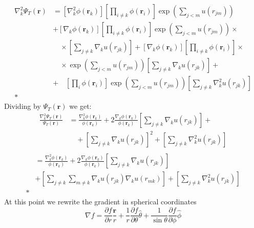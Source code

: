 \begin{align}
    \nabla_k^2 \Psi_T(\mathbf{r}) &= \left[ \nabla_k^2 \phi(\mathbf{r}_k) \right] \left[ \prod_{i \neq k} \phi(\mathbf{r}_i) \right] \exp{\left(\sum_{j<m}u(r_{jm})\right)} \nonumber\\ 
    &+ \left[ \nabla_k \phi(\mathbf{r}_k) \right]  \left[ \prod_{i \neq k} \phi(\mathbf{r}_i) \right] \exp{\left(\sum_{j<m}u(r_{jm})\right)}\times \nonumber\\
    & \quad \times \left[ \sum_{j\neq k} \nabla_k u(r_{jk}) \right] + \left[ \nabla_k \phi(\mathbf{r}_k) \right] \left[ \prod_{i \neq k} \phi(\mathbf{r}_i) \right] \times \nonumber\\ 
    & \quad \times \exp{\left(\sum_{j<m} u(r_{jm}) \right)} \left[ \sum_{j\neq k} \nabla_k u(r_{jk}) \right] + \nonumber\\ 
    &+\quad\left[\prod_i \phi(\mathbf{r}_i) \right] \exp{\left(\sum_{j<m} u(r_{jm}) \right)} \left[ \sum_{j\neq k} \nabla_k^2 u(r_{jk}) \right]\nonumber\\*
\end{align}
Dividing by $\Psi_T(\mathbf{r})$ we get: 
\begin{align*}
    \frac{ \nabla_k^2 \Psi_T(\mathbf{r})}{\Psi_T(\mathbf{r})} &= \frac{\nabla_k^2 \phi(\mathbf{r}_k)}{\phi(\mathbf{r}_k)} + 2 \frac{\nabla_k \phi(\mathbf{r}_k)}{\phi(\mathbf{r}_k)} \left[ \sum_{j\neq k} \nabla_k u(r_{jk}) \right] + \\
    & \quad +\left[ \sum_{j\neq k} \nabla_k u(r_{jk}) \right]^2 + \left[ \sum_{j\neq k} \nabla_k^2 u(r_{jk}) \right] \\
\end{align*}
\begin{align}
    &= \frac{\nabla_k^2 \phi(\mathbf{r}_k)}{\phi(\mathbf{r}_k)} + 2 \frac{\nabla_k \phi(\mathbf{r}_k)}{\phi(\mathbf{r}_k)} \left[ \sum_{j\neq k} \nabla_k u(r_{jk}) \right] \nonumber\\
    &+ \left[ \sum_{j\neq k} \sum_{m \neq k} \nabla_k u(r_{jk}) \nabla_k u(r_{mk}) \right] + \left[ \sum_{j\neq k} \nabla_k^2 u(r_{jk}) \right] \nonumber\\*
\end{align}
At this point we rewrite the gradient in spherical coordinates
\begin{equation*}
    \nabla f = \frac{\partial f}{\partial r} \frac{\mathbf{r}}{r} + \frac{1}{r} \frac{\partial f}{\partial \theta} \hat{\theta} + \frac{1}{\sin \theta} \frac{\partial f}{\partial \phi} \hat{\phi}
\end{equation*}

